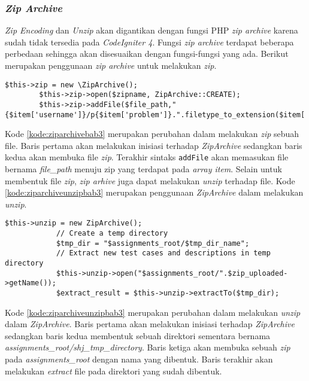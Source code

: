 \subsubsection{\textit{Zip Archive}}
\label{subsubsec:ziparchivebab3}
\textit{Zip Encoding} dan \textit{Unzip} akan digantikan dengan fungsi PHP \textit{zip archive} karena sudah tidak tersedia pada \textit{CodeIgniter 4}. Fungsi \textit{zip archive} terdapat beberapa perbedaan sehingga akan disesuaikan dengan fungsi-fungsi yang ada. Berikut merupakan penggunaan \textit{zip archive} untuk melakukan \textit{zip}.

\begin{lstlisting}[caption=Contoh perubahan penggunaan \textit{library Zip Archive} untuk melakukan \textit{zip}, label=kode:ziparchivebab3]
		$this->zip = new \ZipArchive();
		$this->zip->open($zipname, ZipArchive::CREATE);
		$this->zip->addFile($file_path,"{$item['username']}/p{$item['problem']}.".filetype_to_extension($item['file_type']));
\end{lstlisting}

Kode \ref{kode:ziparchivebab3} merupakan perubahan dalam melakukan \textit{zip} sebuah file. Baris pertama akan melakukan inisiasi terhadap \textit{ZipArchive} sedangkan baris kedua akan membuka file \textit{zip}. Terakhir sintaks \texttt{addFile} akan memasukan file bernama \textit{file\_path} menuju zip yang terdapat pada \textit{array item}. Selain untuk membentuk file \textit{zip}, \textit{zip arhive} juga dapat melakukan \textit{unzip} terhadap file. Kode \ref{kode:ziparchiveunzipbab3} merupakan penggunaan \textit{ZipArchive} dalam melakukan \textit{unzip}.
\begin{lstlisting}[caption=Contoh perubahan penggunaan\textit{library ZipArhive} untuk melakukan \textit{unzip}, label=kode:ziparchiveunzipbab3]
		$this->unzip = new ZipArchive();
			// Create a temp directory
			$tmp_dir = "$assignments_root/$tmp_dir_name";
			// Extract new test cases and descriptions in temp directory
			$this->unzip->open("$assignments_root/".$zip_uploaded->getName());
			$extract_result = $this->unzip->extractTo($tmp_dir);
\end{lstlisting}

Kode \ref{kode:ziparchiveunzipbab3} merupakan perubahan dalam melakukan \textit{unzip} dalam \textit{ZipArchive}. Baris pertama akan melakukan inisiasi terhadap \textit{ZipArchive} sedangkan baris kedua membentuk sebuah direktori sementara bernama \textit{assignments\_root/shj\_tmp\_directory}. Baris ketiga akan membuka sebuah \textit{zip} pada \textit{assignments\_root} dengan nama yang dibentuk. Baris terakhir akan melakukan \textit{extract} file pada direktori yang sudah dibentuk.

